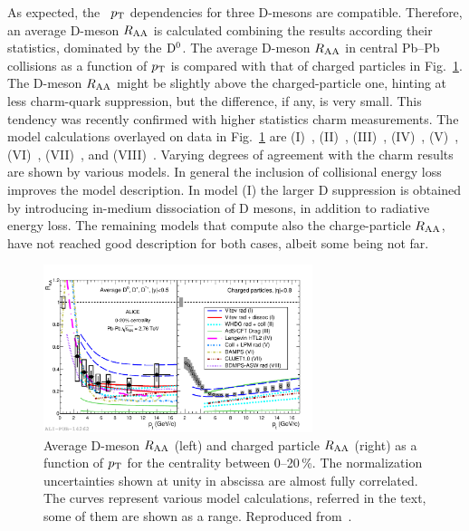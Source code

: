  As expected, the \Raa\ $p_{\rm T}$ dependencies for three D-mesons are compatible. Therefore, an average D-meson $R_{\rm AA}$ is calculated combining the results according their statistics, dominated by the ${\rm D}^0$. The average D-meson $R_{\rm AA}$ in central Pb--Pb collisions as a function of $p_{\rm T}$ is compared with that of charged particles in Fig.~\ref{figks:DmesonRAA}. The D-meson $R_{\rm AA}$ might be slightly above the charged-particle one, hinting at less charm-quark suppression, but the difference, if any, is very small. This tendency was recently confirmed with higher statistics charm measurements. The model calculations overlayed on data in Fig.~\ref{figks:DmesonRAA} are (I)~\cite{Sharma:2009hn,He:2011pd}, (II)~\cite{Horowitz:2011cv}, (III)~\cite{Horowitz:2011wm}, (IV)~\cite{Alberico:2011zy,Monteno:2011gq}, (V)~\cite{Gossiaux:2009mk,Gossiaux:2010yx}, (VI)~\cite{Fochler:2011en}, (VII)~\cite{Buzzatti:2011vt}, and (VIII)~\cite{Armesto:2005iq}. Varying degrees of agreement with the charm results are shown by various models. In general the inclusion of collisional energy loss improves the model description. In model (I) the larger D suppression is obtained by introducing in-medium dissociation of D mesons, in addition to radiative energy loss. The remaining models that compute also the charge-particle $R_{\rm AA}$, have not reached good description for both cases, albeit some being not far.

\begin{figure}
\centering
\includegraphics[width=0.7\textwidth]{heavyflavorfigs/DmesonChargedRAAmodels.pdf}
\caption{Average D-meson $R_{\rm AA}$ (left) and charged particle $R_{\rm AA}$ (right) as a function of $p_{\rm T}$ for the centrality between 0--20\,\%. The normalization uncertainties shown at unity in abscissa are almost fully correlated. The curves represent various model calculations, referred in the text, some of them are shown as a range. Reproduced from~\cite{ALICE:2012ab}.}
\label{figks:DmesonRAA}
\end{figure}

